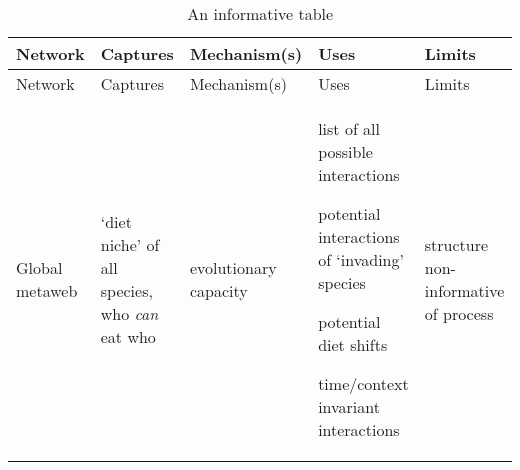 \documentclass[
]{article}
\begin{document}
\begin{longtable}[]{@{}
  >{\raggedright\arraybackslash}p{}
  >{\raggedright\arraybackslash}p{}
  >{\raggedright\arraybackslash}p{}
  >{\raggedright\arraybackslash}p{}
  >{\raggedright\arraybackslash}p{}@{}}
\caption{An informative table}\tabularnewline
\toprule\noalign{}
\begin{minipage}[b]{\linewidth}\raggedright
Network
\end{minipage} & \begin{minipage}[b]{\linewidth}\raggedright
Captures
\end{minipage} & \begin{minipage}[b]{\linewidth}\raggedright
Mechanism(s)
\end{minipage} & \begin{minipage}[b]{\linewidth}\raggedright
Uses
\end{minipage} & \begin{minipage}[b]{\linewidth}\raggedright
Limits
\end{minipage} \\
\midrule\noalign{}
\endfirsthead
\toprule\noalign{}
\begin{minipage}[b]{\linewidth}\raggedright
Network
\end{minipage} & \begin{minipage}[b]{\linewidth}\raggedright
Captures
\end{minipage} & \begin{minipage}[b]{\linewidth}\raggedright
Mechanism(s)
\end{minipage} & \begin{minipage}[b]{\linewidth}\raggedright
Uses
\end{minipage} & \begin{minipage}[b]{\linewidth}\raggedright
Limits
\end{minipage} \\
\midrule\noalign{}
\endhead
\bottomrule\noalign{}
\endlastfoot
Global metaweb & `diet niche' of all species, who \emph{can} eat who &
evolutionary capacity & list of all possible interactions

potential interactions of `invading' species

potential diet shifts

time/context invariant interactions & structure non-informative of
process


\end{longtable}
\end{document}
